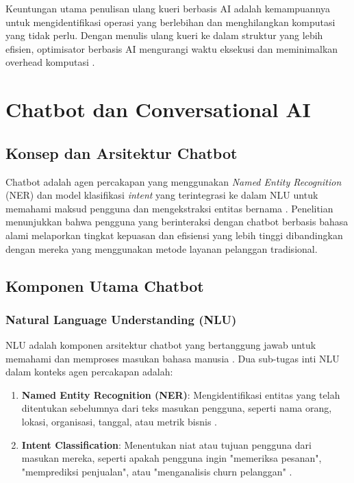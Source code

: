 Keuntungan utama penulisan ulang kueri berbasis AI adalah kemampuannya untuk mengidentifikasi operasi yang berlebihan dan menghilangkan komputasi yang tidak perlu. Dengan menulis ulang kueri ke dalam struktur yang lebih efisien, optimisator berbasis AI mengurangi waktu eksekusi dan meminimalkan overhead komputasi \parencite{shah2024ai}.

\section{Chatbot dan Conversational AI}

\subsection{Konsep dan Arsitektur Chatbot}

Chatbot adalah agen percakapan yang menggunakan \textit{Named Entity Recognition} (NER) dan model klasifikasi \textit{intent} yang terintegrasi ke dalam NLU untuk memahami maksud pengguna dan mengekstraksi entitas bernama \parencite{ali2020chatbot}. Penelitian \textcite{jumriyah2025influence} menunjukkan bahwa pengguna yang berinteraksi dengan chatbot berbasis bahasa alami melaporkan tingkat kepuasan dan efisiensi yang lebih tinggi dibandingkan dengan mereka yang menggunakan metode layanan pelanggan tradisional.

\subsection{Komponen Utama Chatbot}

\subsubsection{Natural Language Understanding (NLU)}

NLU adalah komponen arsitektur chatbot yang bertanggung jawab untuk memahami dan memproses masukan bahasa manusia \parencite{ali2020chatbot,rizou2023efficient}. Dua sub-tugas inti NLU dalam konteks agen percakapan adalah:

\begin{enumerate}
\item \textbf{Named Entity Recognition (NER)}: Mengidentifikasi entitas yang telah ditentukan sebelumnya dari teks masukan pengguna, seperti nama orang, lokasi, organisasi, tanggal, atau metrik bisnis \parencite{rizou2023efficient}.

\item \textbf{Intent Classification}: Menentukan niat atau tujuan pengguna dari masukan mereka, seperti apakah pengguna ingin "memeriksa pesanan", "memprediksi penjualan", atau "menganalisis churn pelanggan" \parencite{perdana2025multi}.
\end{enumerate}

